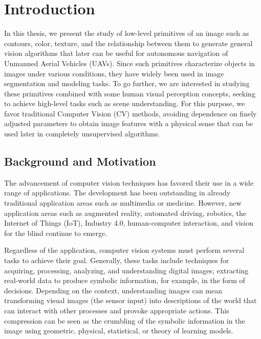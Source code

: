 \chapter*{Introduction}
In this thesis, we present the study of low-level primitives of an image such as contours, color, texture, and the relationship between them to generate general vision algorithms that later can be useful for autonomous navigation of Unmanned Aerial Vehicles (UAVs). Since such primitives characterize objects in images under various conditions, they have widely been used in image segmentation and modeling tasks. To go further, we are interested in studying these primitives combined with some human visual perception concepts, seeking to achieve high-level tasks such as scene understanding. For this purpose, we favor traditional Computer Vision (CV) methods, avoiding dependence on finely adjusted parameters to obtain image features with a physical sense that can be used later in completely unsupervised algorithms.

\section*{Background and Motivation}
The advancement of computer vision techniques has favored their use in a wide range of applications. The development has been outstanding in already traditional application areas such as multimedia or medicine. However, new application areas such as augmented reality, automated driving, robotics, the Internet of Things (IoT), Industry 4.0, human-computer interaction, and vision for the blind continue to emerge.

Regardless of the application, computer vision systems must perform several tasks to achieve their goal. Generally, these tasks include techniques for acquiring, processing, analyzing, and understanding digital images; extracting real-world data to produce symbolic information, for example, in the form of decisions. Depending on the context, understanding images can mean transforming visual images (the sensor input) into descriptions of the world that can interact with other processes and provoke appropriate actions. This compression can be seen as the crumbling of the symbolic information in the image using geometric, physical, statistical, or theory of learning models.

